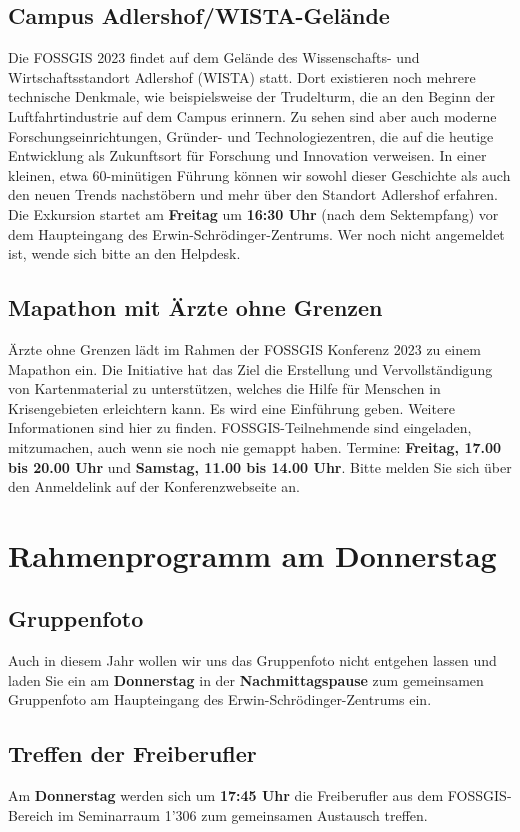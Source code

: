 \subsection*{Campus Adlershof/WISTA-Gelände}
Die FOSSGIS 2023 findet auf dem Gelände des Wissenschafts- und Wirtschaftsstandort Adlershof (WISTA) statt. Dort existieren noch mehrere technische Denkmale, wie beispielsweise der Trudelturm, die an den Beginn der Luftfahrtindustrie auf dem Campus erinnern. Zu sehen sind aber auch moderne Forschungseinrichtungen, Gründer- und Technologiezentren, die auf die heutige Entwicklung als Zukunftsort für Forschung und Innovation verweisen. In einer kleinen, etwa 60-minütigen Führung können wir sowohl dieser Geschichte als auch den neuen Trends nachstöbern und mehr über den Standort Adlershof erfahren.
Die Exkursion startet am {\bfseries Freitag} um {\bfseries 16:30 Uhr} (nach dem Sektempfang) vor dem Haupteingang des Erwin-Schrödinger-Zentrums. Wer noch nicht angemeldet ist, wende sich bitte an den Helpdesk.

\subsection*{Mapathon mit Ärzte ohne Grenzen}
Ärzte ohne Grenzen lädt im Rahmen der FOSSGIS Konferenz 2023 zu einem Mapathon ein. Die Initiative hat das Ziel die Erstellung und Vervollständigung von Kartenmaterial zu unterstützen, welches die Hilfe für Menschen in Krisengebieten erleichtern kann. Es wird eine Einführung geben. Weitere Informationen sind hier zu finden. FOSSGIS-Teilnehmende sind eingeladen, mitzumachen, auch wenn sie noch nie gemappt haben.
Termine: {\bfseries Freitag, 17.00 bis 20.00 Uhr} und {\bfseries Samstag, 11.00 bis 14.00 Uhr}. Bitte melden Sie sich über den Anmeldelink auf der Konferenzwebseite an.

\section*{Rahmenprogramm am Donnerstag}
\subsection*{Gruppenfoto}
Auch in diesem Jahr wollen wir uns das Gruppenfoto nicht entgehen lassen und laden Sie ein am {\bfseries Donnerstag} in der {\bfseries Nachmittagspause} zum gemeinsamen Gruppenfoto am Haupteingang des Erwin-Schrödinger-Zentrums ein.

\subsection*{Treffen der Freiberufler}
Am {\bfseries Donnerstag} werden sich um {\bfseries 17:45 Uhr} die Freiberufler aus dem FOSSGIS-Bereich im Seminarraum 1'306 zum gemeinsamen Austausch treffen.

